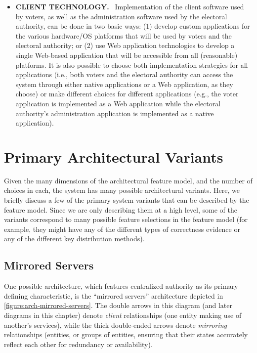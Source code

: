 \begin{itemize}
\item \textbf{CLIENT TECHNOLOGY.} \ Implementation of the client
  software used by voters, as well as the administration software used
  by the electoral authority, can be done in two basic ways: (1)
  develop custom applications for the various hardware/OS platforms
  that will be used by voters and the electoral authority; or (2) use
  Web application technologies to develop a single Web-based
  application that will be accessible from all (reasonable)
  platforms. It is also possible to choose both implementation
  strategies for all applications (i.e., both voters and the electoral
  authority can access the system through either native applications
  or a Web application, as they choose) or make different choices for
  different applications (e.g., the voter application is implemented
  as a Web application while the electoral authority's administration
  application is implemented as a native application).

\end{itemize}

\section{Primary Architectural Variants}
\label{section:primary_architectural_variants}

Given the many dimensions of the architectural feature model, and the
number of choices in each, the system has many possible architectural
variants. Here, we briefly discuss a few of the primary system
variants that can be described by the feature model. Since we are only
describing them at a high level, some of the variants correspond to
many possible feature selections in the feature model (for example,
they might have any of the different types of correctness evidence or
any of the different key distribution methods).

\subsection{Mirrored Servers}

One possible architecture, which features centralized authority as its
primary defining characteristic, is the ``mirrored servers''
architecture depicted in \autoref{figure:arch-mirrored-servers}. The
double arrows in this diagram (and later diagrams in this chapter)
denote \emph{client} relationships (one entity making use of another's
services), while the thick double-ended arrows denote \emph{mirroring}
relationships (entities, or groups of entities, ensuring that their
states accurately reflect each other for redundancy or availability).

